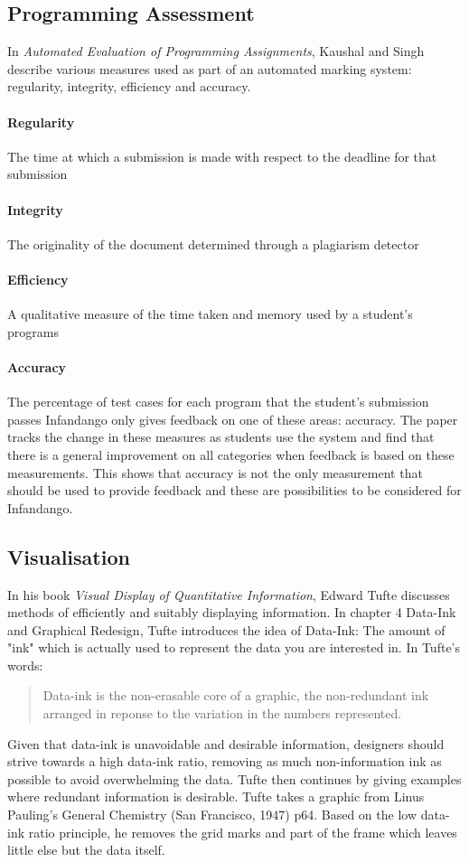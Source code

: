 \subsection{Programming Assessment}
In {\it Automated Evaluation of Programming Assignments}\cite{automate_evaluation}, Kaushal and Singh describe various measures used as part of an automated marking system: regularity, integrity, efficiency and accuracy. \paragraph{Regularity} The time at which a submission is made with respect to the deadline for that submission
\paragraph{Integrity} The originality of the document determined through a plagiarism detector
\paragraph{Efficiency} A qualitative measure of the time taken and memory used by a student's programs
\paragraph{Accuracy} The percentage of test cases for each program that the student's submission passes
Infandango only gives feedback on one of these areas: accuracy. The paper tracks the change in these measures as students use the system and find that there is a general improvement on all categories when feedback is based on these measurements. This shows that accuracy is not the only measurement that should be used to provide feedback and these are possibilities to be considered for Infandango.

\subsection{Visualisation}
In his book {\it Visual Display of Quantitative Information}\cite{visual_explanations}, Edward Tufte discusses methods of efficiently and suitably displaying information. In chapter 4 Data-Ink and Graphical Redesign, Tufte introduces the idea of Data-Ink: The amount of "ink" which is actually used to represent the data you are interested in. In Tufte's words:

\begin{quote}Data-ink is the non-erasable core of a graphic, the non-redundant ink arranged in reponse to the variation in the numbers represented.
\end{quote}
Given that data-ink is unavoidable and desirable information, designers should strive towards a high data-ink ratio, removing as much non-information ink as possible to avoid overwhelming the data. Tufte then continues by giving examples where redundant information is desirable.
Tufte takes a graphic from Linus Pauling's General Chemistry (San Francisco, 1947) p64. Based on the low data-ink ratio principle, he removes the grid marks and part of the frame which leaves little else but the data itself.

